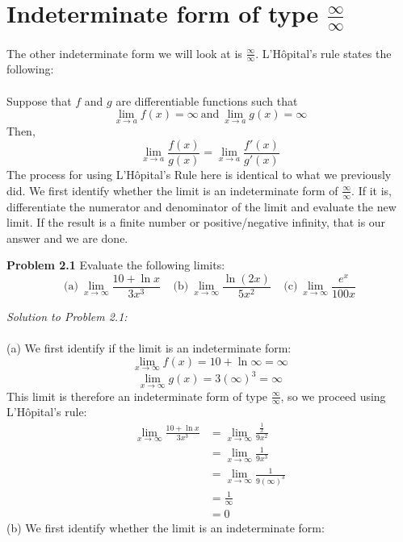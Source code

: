 \documentclass[11pt]{scrartcl}
\begin{document}
\section{Indeterminate form of type $\frac{\infty}{\infty}$}
\noindent 
The other indeterminate form we will look at is $\frac{\infty}{\infty}$. L'Hôpital's rule states the following: \\
\\
\noindent 
Suppose that $f$ and $g$ are differentiable functions such that
$$\lim_{x \to a}f(x)=\infty \ \text{and} \ \lim_{x \to a}g(x)=\infty$$
\noindent 
Then, 
$$\lim_{x \to a}\frac{f(x)}{g(x)}=\lim_{x \to a}\frac{f'(x)}{g'(x)}$$
\noindent 
The process for using L'Hôpital's Rule here is identical to what we previously did. We first identify whether the limit is an indeterminate form of $\frac{\infty}{\infty}$. If it is, differentiate the numerator and denominator of the limit and evaluate the new limit. If the result is a finite number or positive/negative infinity, that is our answer and we are done.  
\begin{tcolorbox}
[colback=purple!5!white,colframe=purple!75!black]
\textbf{Problem 2.1} Evaluate the following limits:
$$\text{(a)} \ \lim_{x \to \infty} \frac{10 + \ln x}{3x^3} \ \ \ \ \ \text{(b)} \ \lim_{x \to \infty} \frac{\ln (2x)}{5x^2} \ \ \ \ \ \text{(c)} \ \lim_{x \to \infty} \frac{e^x}{100x}$$
\end{tcolorbox}
\noindent
\textit{Solution to Problem 2.1:} \\
\\
\noindent 
(a) We first identify if the limit is an indeterminate form: 
$$\lim_{x \to \infty}f(x)=10 + \ln \infty=\infty$$
$$\lim_{x \to \infty}g(x)=3(\infty)^3=\infty$$
\noindent 
This limit is therefore an indeterminate form of type $\frac{\infty}{\infty}$, so we proceed using L'Hôpital's rule: 
\begin{align*}
\lim_{x \to \infty} \frac{10+ \ln x}{3x^3} &= \lim_{x \to \infty}{\frac{\frac{1}{x}}{9x^2}} \\
                                           &=  \lim_{x\to \infty}{\frac{1}{9x^3}} \\
                                           &=    \lim_{x \to \infty}{\frac{1}{9(\infty)^3}} \\
                                                                    &=    {\frac{1}{\infty}} \\
                                           &=0
\end{align*}
\noindent 
(b) We first identify whether the limit is an indeterminate form: 
\end{document}
